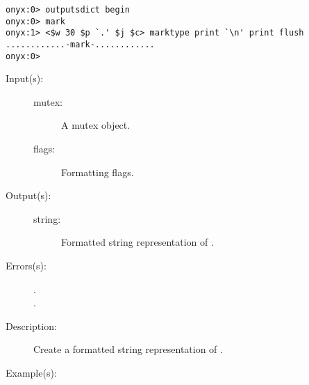 \begin{description}
\begin{description}
\begin{verbatim}
onyx:0> outputsdict begin
onyx:0> mark
onyx:1> <$w 30 $p `.' $j $c> marktype print `\n' print flush
............-mark-............
onyx:0>
		\end{verbatim}
	\end{description}
\label{outputsdict:mutextype}
\item[{\onyxop{mutex flags}{mutextype}{string}}: ]
	\begin{description}\item[]
	\item[Input(s): ]
		\begin{description}\item[]
		\item[mutex: ]
			A mutex object.
		\item[flags: ]
			Formatting flags.
		\end{description}
	\item[Output(s): ]
		\begin{description}\item[]
		\item[string: ]
			Formatted string representation of .
		\end{description}
	\item[Errors(s): ]
		\begin{description}\item[]
		\item[.]
		\item[.]
		\end{description}
	\item[Description: ]
		Create a formatted string representation of .
	\item[Example(s): ]\begin{verbatim}


\end{verbatim}
\end{description}
\end{description}
